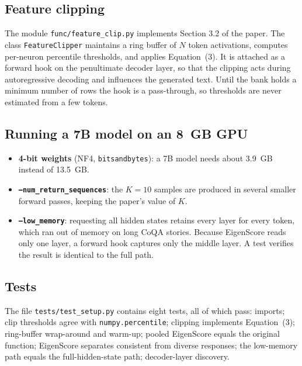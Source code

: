 \documentclass[conference]{IEEEtran}
\begin{document}
\subsection{Feature clipping}
The module \texttt{func/feature\_clip.py} implements Section 3.2 of the paper. The class \texttt{FeatureClipper} maintains a ring buffer of $N$ token activations, computes per-neuron percentile thresholds, and applies Equation~(3). It is attached as a forward hook on the penultimate decoder layer, so that the clipping acts during autoregressive decoding and influences the generated text. Until the bank holds a minimum number of rows the hook is a pass-through, so thresholds are never estimated from a few tokens.

\subsection{Running a 7B model on an 8~GB GPU}
\begin{itemize}
  \item \textbf{4-bit weights} (NF4, \texttt{bitsandbytes}): a 7B model needs about 3.9~GB instead of 13.5~GB.
  \item \textbf{\texttt{--num\_return\_sequences}}: the $K=10$ samples are produced in several smaller forward passes, keeping the paper's value of $K$.
  \item \textbf{\texttt{--low\_memory}}: requesting all hidden states retains every layer for every token, which ran out of memory on long CoQA stories. Because EigenScore reads only one layer, a forward hook captures only the middle layer. A test verifies the result is identical to the full path.
\end{itemize}

\subsection{Tests}
The file \texttt{tests/test\_setup.py} contains eight tests, all of which pass: imports; clip thresholds agree with \texttt{numpy.percentile}; clipping implements Equation~(3); ring-buffer wrap-around and warm-up; pooled EigenScore equals the original function; EigenScore separates consistent from diverse responses; the low-memory path equals the full-hidden-state path; decoder-layer discovery.

\end{document}
